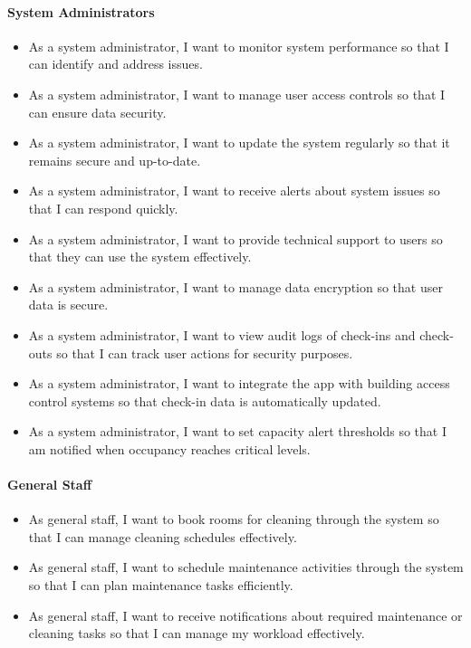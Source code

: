\documentclass[11pt,a4paper]{article}
\begin{document}
\paragraph{System Administrators}
\begin{itemize}
    \item As a system administrator, I want to monitor system performance so that I can identify and address issues.
    \item As a system administrator, I want to manage user access controls so that I can ensure data security.
    \item As a system administrator, I want to update the system regularly so that it remains secure and up-to-date.
    \item As a system administrator, I want to receive alerts about system issues so that I can respond quickly.
    \item As a system administrator, I want to provide technical support to users so that they can use the system effectively.
    \item As a system administrator, I want to manage data encryption so that user data is secure.
    \item As a system administrator, I want to view audit logs of check-ins and check-outs so that I can track user actions for security purposes.
    \item As a system administrator, I want to integrate the app with building access control systems so that check-in data is automatically updated.
    \item As a system administrator, I want to set capacity alert thresholds so that I am notified when occupancy reaches critical levels.
\end{itemize}

\paragraph{General Staff}
\begin{itemize}
    \item As general staff, I want to book rooms for cleaning through the system so that I can manage cleaning schedules effectively.
    \item As general staff, I want to schedule maintenance activities through the system so that I can plan maintenance tasks efficiently.
    \item As general staff, I want to receive notifications about required maintenance or cleaning tasks so that I can manage my workload effectively.
\end{itemize}
\end{document}
